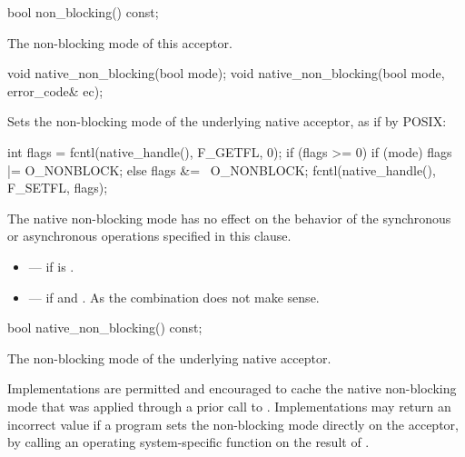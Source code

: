 \begin{itemdecl}
bool non_blocking() const;
\end{itemdecl}

\begin{itemdescr}
\pnum
\returns The non-blocking mode of this acceptor.
\end{itemdescr}

\begin{itemdecl}
void native_non_blocking(bool mode);
void native_non_blocking(bool mode, error_code& ec);
\end{itemdecl}

\begin{itemdescr}
\pnum
\effects Sets the non-blocking mode of the underlying native acceptor, as if by POSIX: 
\begin{codeblock}
int flags = fcntl(native_handle(), F_GETFL, 0);
if (flags >= 0)
{
  if (mode)
    flags |= O_NONBLOCK;
  else
    flags &= ~O_NONBLOCK;
  fcntl(native_handle(), F_SETFL, flags);
}
\end{codeblock}


\pnum
 The native non-blocking mode has no effect on the behavior of the synchronous or asynchronous operations specified in this clause.

\pnum
\errors
\begin{itemize}
\item
{} --- if  is .
\item
{} --- if  and . \enternote As the combination does not make sense. \exitnote
\end{itemize}
\end{itemdescr}

\begin{itemdecl}
bool native_non_blocking() const;
\end{itemdecl}

\begin{itemdescr}
\pnum
\returns The non-blocking mode of the underlying native acceptor.

\pnum
\remarks Implementations are permitted and encouraged to cache the native non-blocking mode that was applied through a prior call to . Implementations may return an incorrect value if a program sets the non-blocking mode directly on the acceptor, by calling an operating system-specific function on the result of .
\end{itemdescr}

